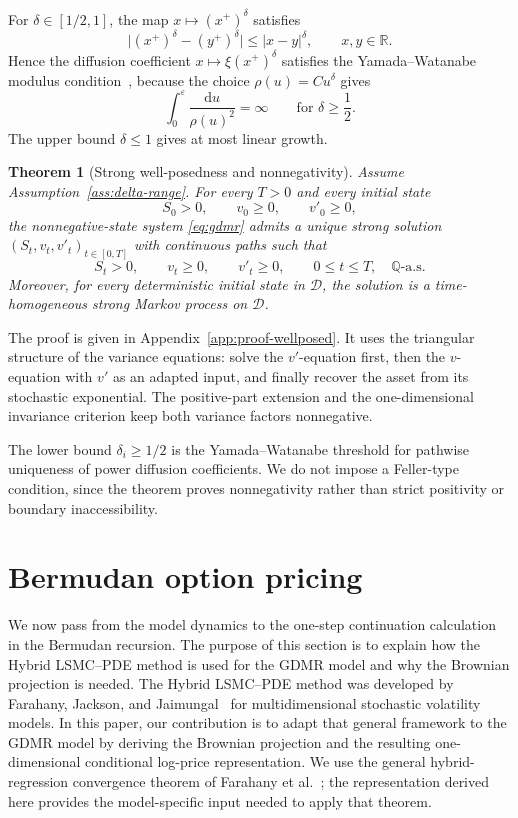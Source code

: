 \documentclass[pdflatex,sn-mathphys-num]{sn-jnl}
\theoremstyle{thmstyleone}%
\newtheorem{theorem}{Theorem}[section]
\theoremstyle{thmstylethree}%
\theoremstyle{thmstyletwo}%
\newcommand{\dd}{\mathrm d}
\newcommand{\Q}{\mathbb Q}
\newcommand{\R}{\mathbb R}
\begin{document}
For $\delta\in[1/2,1]$, the map $x\mapsto (x^+)^\delta$ satisfies
$$
\bigl|(x^+)^\delta-(y^+)^\delta\bigr|
\le |x-y|^\delta,\qquad x,y\in\R.
$$
Hence the diffusion coefficient $x\mapsto \xi(x^+)^\delta$ satisfies the
Yamada--Watanabe modulus condition~\cite{yamada1971uniqueness}, because the choice $\rho(u)=C u^\delta$
gives
$$
\int_0^\varepsilon \frac{\dd u}{\rho(u)^2}
=\infty
\qquad\text{for }\delta\ge \frac12.
$$
The upper bound $\delta\le1$ gives at most linear growth.

\begin{theorem}[Strong well-posedness and nonnegativity]\label{thm:wellposed}
Assume Assumption~\ref{ass:delta-range}. For every $T>0$ and every initial
state
$$
S_0>0,\qquad v_0\ge0,\qquad v'_0\ge0,
$$
the nonnegative-state system \eqref{eq:gdmr} admits a unique strong solution
$(S_t,v_t,v'_t)_{t\in[0,T]}$ with continuous paths such that
$$
S_t>0,\qquad v_t\ge0,\qquad v'_t\ge0,\qquad
0\le t\le T,\quad \Q\text{-a.s.}
$$
Moreover, for every deterministic initial state in $\mathcal D$, the solution
is a time-homogeneous strong Markov process on $\mathcal D$.
\end{theorem}

The proof is given in Appendix~\ref{app:proof-wellposed}. It uses the
triangular structure of the variance equations: solve the $v'$-equation first,
then the $v$-equation with $v'$ as an adapted input, and finally recover the
asset from its stochastic exponential. The positive-part extension and the
one-dimensional invariance criterion keep both variance factors nonnegative.

The lower bound $\delta_i\ge1/2$ is the Yamada--Watanabe threshold for
pathwise uniqueness of power diffusion coefficients. We do not impose a
Feller-type condition, since the theorem proves nonnegativity rather than strict
positivity or boundary inaccessibility.

\section{Bermudan option pricing}\label{sec:conditional_pde}

We now pass from the model dynamics to the one-step continuation calculation in
the Bermudan recursion. The purpose of this section is to explain how the
Hybrid LSMC--PDE method is used for the GDMR model and why the
Brownian projection is needed.
The Hybrid LSMC--PDE method was developed by Farahany, Jackson, and
Jaimungal~\cite{farahany2020mixing} for multidimensional stochastic
volatility models. In this paper, our contribution is to adapt that general
framework to the GDMR model by deriving the Brownian projection and the
resulting one-dimensional conditional log-price representation. We use the
general hybrid-regression convergence theorem of Farahany et
al.~\cite{farahany2020mixing}; the representation derived here provides the
model-specific input needed to apply that theorem.
\end{document}
